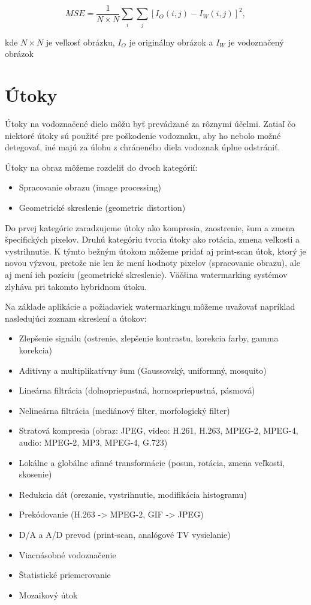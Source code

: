 \begin{equation}
MSE = \frac{1}{N\times N} \sum_i \sum_j[I_O(i,j) - I_W(i,j)]^2,
\end{equation}

kde $N\times N$ je veľkosť obrázku, $I_O$ je originálny obrázok a $I_W$ je vodoznačený obrázok \cite{QRdecomposition}

\section{Útoky}
Útoky na vodoznačené dielo môžu byť prevádzané za rôznymi účelmi. Zatiaľ čo niektoré útoky sú použité pre poškodenie vodoznaku, aby ho nebolo možné detegovať, iné majú za úlohu z chráneného diela vodoznak úplne odstrániť.

Útoky na obraz môžeme rozdeliť do dvoch kategórií:
\begin{itemize}
\item Spracovanie obrazu (image processing)
\item Geometrické skreslenie (geometric distortion)
\end{itemize}

Do prvej kategórie zaradzujeme útoky ako kompresia, zaostrenie, šum a zmena špecifických pixelov. Druhú kategóriu tvoria útoky ako rotácia, zmena veľkosti a vystrihnutie. K týmto bežným útokom môžeme pridať aj print-scan útok, ktorý je novou výzvou, pretože nie len že mení hodnoty pixelov (spracovanie obrazu), ale aj mení ich pozíciu (geometrické skreslenie). Väčšina watermarking systémov zlyháva pri takomto hybridnom útoku. \cite{Chen}

Na základe aplikácie a požiadaviek watermarkingu môžeme uvažovať napríklad nasledujúci zoznam skreslení a útokov: \cite{Katzenbeisser}

\begin{itemize}
\item	Zlepšenie signálu (ostrenie, zlepšenie kontrastu, korekcia farby, gamma korekcia)
\item	Aditívny a multiplikatívny šum (Gaussovský, uniformný, mosquito)
\item	Lineárna filtrácia (dolnopriepustná, hornospriepustná, pásmová)
\item	Nelineárna filtrácia (mediánový filter, morfologický filter)
\item	Stratová kompresia (obraz: JPEG, video: H.261, H.263, MPEG-2, MPEG-4, audio: MPEG-2, MP3, MPEG-4, G.723)
\item	Lokálne a globálne afinné transformácie (posun, rotácia, zmena veľkosti, skosenie)
\item	Redukcia dát (orezanie, vystrihnutie, modifikácia histogramu)
\item	Prekódovanie (H.263 -> MPEG-2, GIF -> JPEG)
\item	D/A a A/D prevod (print-scan, analógové TV vysielanie)
\item	Viacnásobné vodoznačenie
\item	Štatistické priemerovanie
\item	Mozaikový útok
\end{itemize}


